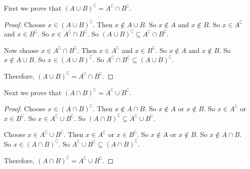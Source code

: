 First we prove that $(A\cup B)^\complement = A^\complement \cap B^\complement.$

\begin{proof}
    Choose $x \in (A\cup B)^\complement.$
    Then $x \notin A\cup B.$
    So $x \notin A$ and $x \notin B.$
    So $x \in A^\complement$ and $x \in B^\complement.$
    So $x \in A^\complement \cap B^\complement.$
    So $(A\cup B)^\complement \subseteq A^\complement \cap B^\complement.$

    Now choose $x \in A^\complement \cap B^\complement.$
    Then $x \in A^\complement$ and $x \in B^\complement.$
    So $x \notin A$ and $x \notin B.$
    So $x \notin A\cup B.$
    So $x \in (A\cup B)^\complement.$
    So $A^\complement \cap B^\complement \subseteq (A\cup B)^\complement.$

    Therefore, $(A\cup B)^\complement = A^\complement \cap B^\complement.$
\end{proof}

Next we prove that $(A\cap B)^\complement = A^\complement \cup B^\complement.$

\begin{proof}
    Choose $x \in (A\cap B)^\complement.$
    Then $x \notin A\cap B.$
    So $x \notin A$ or $x \notin B.$
    So $x \in A^\complement$ or $x \in B^\complement.$
    So $x \in A^\complement \cup B^\complement.$
    So $(A\cap B)^\complement \subseteq A^\complement \cup B^\complement.$

    Choose $x \in A^\complement \cup B^\complement.$
    Then $x \in A^\complement$ or $x \in B^\complement.$
    So $x \notin A$ or $x \notin B.$
    So $x \notin A\cap B.$
    So $x \in (A\cap B)^\complement.$
    So $A^\complement \cup B^\complement \subseteq (A\cap B)^\complement.$

    Therefore, $(A\cap B)^\complement = A^\complement \cup B^\complement.$
\end{proof}